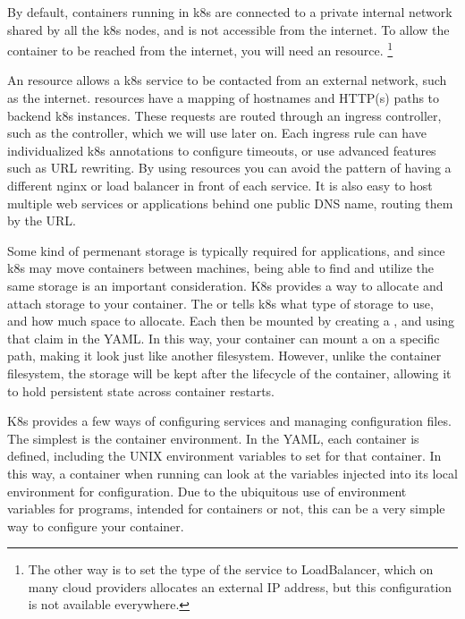 \documentclass[11pt,twoside]{article}
\begin{document}
By default, containers running in k8s are connected to a private internal network shared by all
the k8s nodes, and is not accessible from the internet.  To allow the container to be reached
from the internet, you will need an  resource.
\footnote{The other way is to set the type of the service to LoadBalancer, which on many
cloud providers allocates an external IP address, but this configuration is not available
everywhere.}

An  resource allows a k8s service to be contacted from an external network,
such as the internet.   resources have a mapping of hostnames and HTTP(s) paths
to backend k8s  instances.  These requests are routed through an ingress
controller, such as the  controller, which we will use later on.
Each ingress rule can have individualized k8s annotations to configure timeouts,
or use advanced features such as URL rewriting.  By using  resources you can
avoid the pattern of having a different nginx or load balancer in front of each service.
It is also easy to host multiple web services or applications behind one public DNS name,
routing them by the URL.

Some kind of permenant storage is typically required for applications, and since k8s may move containers
between machines, being able to find and utilize the same storage is an important
consideration.  K8s provides a way to allocate and attach storage to your container.
The  or  tells k8s what type of storage to use, and how
much space to allocate.  Each  then be mounted by creating a , and using that claim in the  YAML.  In this way, your
container can mount a  on a specific path, making it look just like another
filesystem.  However, unlike the container filesystem, the 
storage will be kept after the lifecycle of the container, allowing it to hold persistent
state across container restarts.

K8s provides a few ways of configuring services and managing configuration files.  The
simplest is the container environment.  In the  YAML, each container
is defined, including the UNIX environment variables to set for that container.  In this
way, a container when running can look at the variables injected into its local environment
for configuration.  Due to the ubiquitous use of environment variables for programs, intended
for containers or not, this can be a very simple way to configure your container.
\end{document}
